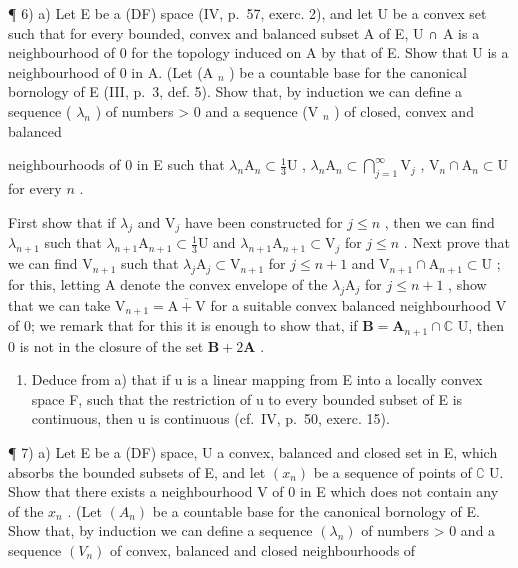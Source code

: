 ¶ 6) a) Let E be a (DF) space (IV, p.~57, exerc. 2), and let U be a convex set such that for every bounded, convex and balanced subset A of E, U ∩ A is a neighbourhood of 0 for the topology induced on A by that of E. Show that U is a neighbourhood of 0 in A. (Let (A \(_{n}\) ) be a countable base for the canonical bornology of E (III, p.~3, def. 5). Show that, by induction we can define a sequence ( \(\lambda_{n}\) ) of numbers \textgreater{} 0 and a sequence (V \(_{n}\) ) of closed, convex and balanced

neighbourhoods of 0 in E such that \(\lambda_{n}\mathrm{A}_{n} \subset \frac{1}{3}\mathrm{U}\) , \(\lambda_{n}\mathrm{A}_{n} \subset \bigcap_{j=1}^{\infty} \mathrm{V}_{j}\) , \(\mathrm{V}_{n} \cap \mathrm{A}_{n} \subset \mathrm{U}\) for every \(n\) .

First show that if \(\lambda_{j}\) and \(\mathrm{V}_j\) have been constructed for \(j\leqslant n\) , then we can find \(\lambda_{n + 1}\) such that \(\lambda_{n + 1}\mathrm{A}_{n + 1}\subset \frac{1}{3}\mathrm{U}\) and \(\lambda_{n + 1}\mathrm{A}_{n + 1}\subset \mathrm{V}_j\) for \(j\leqslant n\) . Next prove that we can find \(\mathrm{V}_{n + 1}\) such that \(\lambda_j\mathrm{A}_j\subset \mathrm{V}_{n + 1}\) for \(j\leqslant n + 1\) and \(\mathrm{V}_{n + 1}\cap \mathrm{A}_{n + 1}\subset \mathrm{U}\) ; for this, letting A denote the convex envelope of the \(\lambda_{j}\mathrm{A}_{j}\) for \(j\leqslant n + 1\) , show that we can take \(\mathrm{V}_{n + 1} = \overline{\mathrm{A} + \mathrm{V}}\) for a suitable convex balanced neighbourhood V of 0; we remark that for this it is enough to show that, if \(\mathbf{B} = \mathbf{A}_{n + 1}\cap \mathbb{C}\) U, then 0 is not in the closure of the set \(\mathbf{B} + 2\mathbf{A}\) .

\begin{enumerate}
\def\labelenumi{\alph{enumi})}
\setcounter{enumi}{1}
\tightlist
\item
  Deduce from a) that if u is a linear mapping from E into a locally convex space F, such that the restriction of u to every bounded subset of E is continuous, then u is continuous (cf.~IV, p.~50, exerc. 15).
\end{enumerate}

¶ 7) a) Let E be a (DF) space, U a convex, balanced and closed set in E, which absorbs the bounded subsets of E, and let \((x_n)\) be a sequence of points of \(\complement\) U. Show that there exists a neighbourhood V of 0 in E which does not contain any of the \(x_n\) . (Let \((A_n)\) be a countable base for the canonical bornology of E. Show that, by induction we can define a sequence \((\lambda_n)\) of numbers \textgreater{} 0 and a sequence \((V_n)\) of convex, balanced and closed neighbourhoods of

